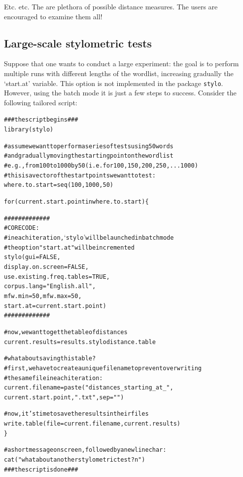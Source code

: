 \documentclass[11pt,a4paper]{article}
\def\code#1{{\tt #1}}
\begin{document}
Etc. etc. The are plethora of possible distance measures. The users are 
encouraged to examine them all!

\subsection{Large-scale stylometric tests}


Suppose that one wants to conduct a large experiment: the goal is to perform multiple runs with different lengths of the wordlist, increasing gradually the `start.at' variable. This option is not implemented in the package \code{stylo}. However, using the batch mode it is just a few steps to success. Consider the following tailored script:

\begin{alltt}
### the script begins ###
library(stylo)

# assume we want to perform a series of tests using 50 words
# and gradually moving the starting point on the wordlist
# e.g., from 100 to 1000 by 50 (i.e. for 100, 150, 200, 250, ... 1000)
# this is a vector of the start points we want to test:
where.to.start = seq(100,1000,50)

for(current.start.point in where.to.start) \{ 

    #############
    # CORE CODE:
    # in each iteration, `stylo' will be launched in batch mode
    # the option "start.at" will be incremented
    stylo(gui = FALSE,
          display.on.screen = FALSE,
          use.existing.freq.tables = TRUE,
          corpus.lang = "English.all",
          mfw.min = 50, mfw.max = 50,
          start.at = current.start.point) 
    #############

  # now, we want to get the table of distances
  current.results = results.stylodistance.table

  # what about saving this table?
  # first, we have to create a unique file name to prevent overwriting
  # the same file in each iteration:
  current.filename = paste("distances_starting_at_",
                       current.start.point, ".txt", sep="")
                       
  # now, it's time to save the results in their files
  write.table(file = current.filename, current.results)
\}

# a short message on screen, followed by a newline char:
cat("what about another stylometric test?n")
### the script is done ###
\end{alltt}
\end{document}
